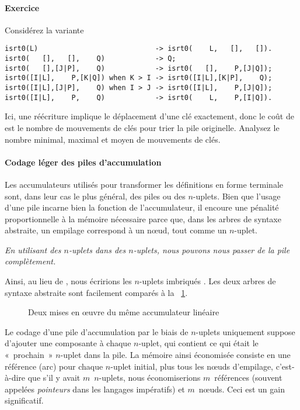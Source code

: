 \paragraph{Exercice}

Considérez la variante
{\small
\begin{verbatim}
isrt0(L)                            -> isrt0(    L,   [],   []).
isrt0(   [],   [],    Q)            -> Q;
isrt0(   [],[J|P],    Q)            -> isrt0(   [],    P,[J|Q]);
isrt0([I|L],    P,[K|Q]) when K > I -> isrt0([I|L],[K|P],    Q);
isrt0([I|L],[J|P],    Q) when I > J -> isrt0([I|L],    P,[J|Q]);
isrt0([I|L],    P,    Q)            -> isrt0(    L,    P,[I|Q]).
\end{verbatim}
}
\noindent Ici, une réécriture implique le déplacement d'une clé
exactement, donc le coût de  est le nombre de
mouvements de clés pour trier la pile originelle. Analysez le nombre
minimal, maximal et moyen de mouvements de clés.

\paragraph{Codage léger des piles d'accumulation}

Les accumulateurs utilisés pour transformer les définitions en forme
terminale sont, dans leur cas le plus général, des piles ou des
\(n\)-uplets. Bien que l'usage d'une pile incarne bien la fonction de
l'accumulateur, il encoure une pénalité proportionnelle à la mémoire
nécessaire parce que, dans les arbres de syntaxe abstraite, un
empilage correspond à un nœud, tout comme un \(n\)-uplet.

\begin{center}
\emph{En utilisant des \(n\)-uplets dans des \(n\)-uplets, nous
pouvons nous passer de la pile complètement.}
\end{center}
Ainsi, au lieu de
\erlcode{[\{k3,\(X_1\)\},\{k1,\(V\),\(E\)\},\{k3,\(X_2\)\}]}, nous
écririons les \(n\)-uplets imbriqués
. Les
deux arbres de syntaxe abstraite sont facilement comparés à la
\fig~\ref{fig:tuple_vs_stack}.
\begin{figure}
\centering
{}
\caption{Deux mises en œuvre du même accumulateur linéaire}
\label{fig:tuple_vs_stack}
\end{figure}
Le codage d'une pile d'accumulation par le biais de \(n\)-uplets
uniquement suppose d'ajouter une composante à chaque \(n\)-uplet, qui
contient ce qui était le «~prochain~» \(n\)-uplet dans la pile. La
mémoire ainsi économisée consiste en une référence (arc) pour chaque
\(n\)-uplet initial, plus tous les nœuds d'empilage, c'est-à-dire que
s'il y avait \(m\)~\(n\)-uplets, nous économiserions \(m\)~références
(souvent appelées \emph{pointeurs} dans les langages impératifs) et
\(m\)~nœuds. Ceci est un gain significatif.

